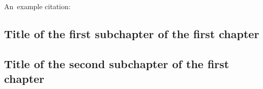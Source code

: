 \chapter{}

An~example citation: \cite{Andel07}

\section{Title of the first subchapter of the first chapter}

\section{Title of the second subchapter of the first chapter}

